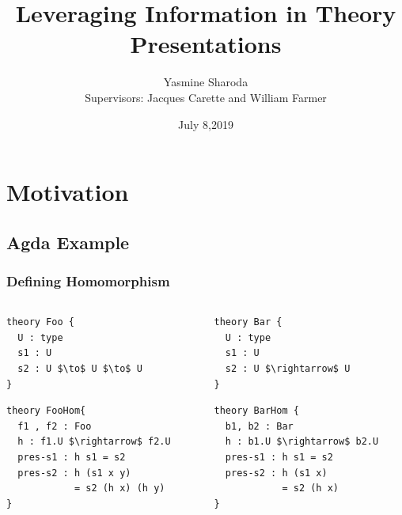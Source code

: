 \documentclass[t,12pt,numbers,fleqn,usenames,xcolor=dvipsnames]{beamer}
\title{Leveraging Information in Theory Presentations}
\author{Yasmine Sharoda\\ \vspace{0.5cm} Supervisors: Jacques Carette and William Farmer}
\institute[]{Department of Computing and Software, McMaster University}
\date{July 8,2019}
\begin{document}
\begin{frame}
\titlepage
\end{frame}

\section{Motivation}

\subsection{Agda Example}
\begin{frame}[fragile]
\frametitle{Defining Homomorphism}
\begin{columns}
	\begin{column}{0.45\textwidth}
\scriptsize		
		\begin{lstlisting}[mathescape]
theory Foo { 
  U : type 
  s1 : U 
  s2 : U $\to$ U $\to$ U
}
		\end{lstlisting}
\pause		
		\begin{lstlisting}
theory FooHom{
  f1 , f2 : Foo 
  h : f1.U $\rightarrow$ f2.U 
  pres-s1 : h s1 = s2  
  pres-s2 : h (s1 x y) 
            = s2 (h x) (h y)
}
		\end{lstlisting}
	\end{column}
	\begin{column}{0.45\textwidth}
\pause		
\scriptsize
	 	\begin{lstlisting}
theory Bar {
  U : type 
  s1 : U 
  s2 : U $\rightarrow$ U 
}
	 	\end{lstlisting}
\pause
		\begin{lstlisting}
theory BarHom { 
  b1, b2 : Bar 
  h : b1.U $\rightarrow$ b2.U 
  pres-s1 : h s1 = s2  
  pres-s2 : h (s1 x) 
            = s2 (h x)
}
		\end{lstlisting}
	\end{column}
\end{columns}
\end{frame}
\end{document}
